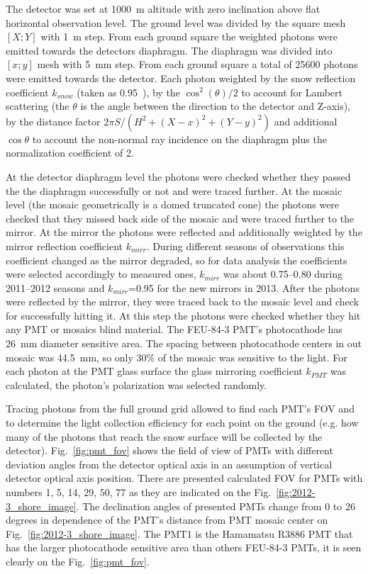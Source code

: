 \documentclass[final,5p,times,twocolumn]{elsarticle}
\begin{document}
The detector was set at 1000~m altitude with zero inclination above flat horizontal observation level. The ground level was divided by the square mesh $[X;Y]$ with 1~m step. From each ground square the weighted photons were emitted towards the detectors diaphragm. The diaphragm was divided into $[x;y]$ mesh with 5~mm step. From each ground square a total of 25600 photons were emitted towards the detector. Each photon weighted by the snow reflection coefficient $k_{snow}$ (taken as 0.95~\cite{war82}), by the $\cos^2(\theta)/2$ to account for Lambert scattering (the $\theta$ is the angle between the direction to the detector and Z-axis), by the distance factor $2\pi{}S/(H^2+(X-x)^2+(Y-y)^2)$ and additional $\cos\theta$ to account the non-normal ray incidence on the diaphragm {\color{red}plus} the normalization coefficient of 2.

At the detector diaphragm level the photons were checked whether they passed the the diaphragm successfully or not and were traced further. At the mosaic level (the mosaic geometrically is a domed truncated cone) the photons were checked that they missed back side of the mosaic and were traced further to the mirror. At the mirror the photons were reflected and additionally weighted by the mirror reflection coefficient $k_{mirr}$. During different seasons of observations this coefficient changed as the mirror degraded, so for data analysis the coefficients were selected accordingly to {\color{red} measured ones}, $k_{mirr}$ was about 0.75--0.80 during 2011--2012 seasons and $k_{mirr}$=0.95 for the new mirrors in 2013. After the photons were reflected by the mirror, they were traced back to the mosaic level and check for successfully hitting it. At this step the photons were checked whether they hit any PMT or mosaics blind material. The \mbox{FEU-84-3} PMT's photocathode has 26~mm diameter sensitive area. The spacing between photocathode centers in out mosaic was 44.5~mm, so only 30\% of the mosaic was sensitive to the light. For each photon at the PMT glass surface the glass mirroring coefficient $k_{PMT}$ was calculated, the photon's polarization was selected randomly.

Tracing photons from the full ground grid allowed to find each PMT's FOV and to determine the light collection efficiency for each point on the ground (e.g. how many of the photons that reach the snow surface will be collected by the detector).
Fig.~\ref{fig:pmt_fov} shows the field of view of PMTs with different deviation angles  from the detector optical axis in an assumption of vertical detector optical axis position. There are presented calculated FOV for PMTs with numbers 1, 5, 14, 29, 50, 77 as they are indicated on the Fig.~\ref{fig:2012-3_shore_image}. The declination angles of presented PMTs change from 0 to 26 degrees in dependence of the PMT's distance from PMT mosaic center on Fig.~\ref{fig:2012-3_shore_image}. The PMT1 is the Hamamatsu R3886 PMT that has the larger photocathode sensitive area than others FEU-84-3 PMTs, it is seen clearly on the Fig.~\ref{fig:pmt_fov}. 
\end{document}
